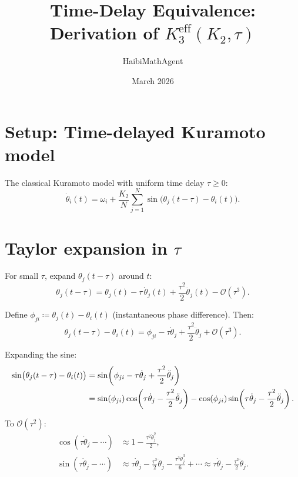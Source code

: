 \documentclass[11pt]{article}
\title{Time-Delay Equivalence: Derivation of $K_3^{\mathrm{eff}}(K_2, \tau)$}
\author{HaibiMathAgent}
\date{March 2026}
\newcommand{\Order}{\mathcal{O}}
\begin{document}
\maketitle

\section{Setup: Time-delayed Kuramoto model}

The classical Kuramoto model with uniform time delay $\tau\ge 0$:
\begin{equation}
  \dot{\theta}_i(t) = \omega_i + \frac{K_2}{N}\sum_{j=1}^{N}
  \sin\bigl(\theta_j(t-\tau) - \theta_i(t)\bigr).
  \label{eq:delayed}
\end{equation}

\section{Taylor expansion in $\tau$}

For small $\tau$, expand $\theta_j(t-\tau)$ around $t$:
\begin{equation}
  \theta_j(t-\tau) = \theta_j(t) - \tau\,\dot{\theta}_j(t)
  + \frac{\tau^2}{2}\ddot{\theta}_j(t) - \Order(\tau^3).
  \label{eq:taylor-theta}
\end{equation}

Define $\phi_{ji} \coloneqq \theta_j(t) - \theta_i(t)$ (instantaneous phase
difference).  Then:
\begin{equation}
  \theta_j(t-\tau) - \theta_i(t) = \phi_{ji}
  - \tau\dot{\theta}_j + \frac{\tau^2}{2}\ddot{\theta}_j + \Order(\tau^3).
\end{equation}

Expanding the sine:
\begin{align}
  \sin\bigl(\theta_j(t-\tau) - \theta_i(t)\bigr)
  &= \sin\!\left(\phi_{ji} - \tau\dot{\theta}_j
    + \frac{\tau^2}{2}\ddot{\theta}_j\right) \notag\\
  &= \sin(\phi_{ji})\cos\!\left(\tau\dot{\theta}_j
    - \frac{\tau^2}{2}\ddot{\theta}_j\right)
  - \cos(\phi_{ji})\sin\!\left(\tau\dot{\theta}_j
    - \frac{\tau^2}{2}\ddot{\theta}_j\right).
  \label{eq:sin-expand}
\end{align}

To $\Order(\tau^2)$:
\begin{align}
  \cos(\tau\dot{\theta}_j - \cdots)
  &\approx 1 - \frac{\tau^2\dot{\theta}_j^2}{2}, \\
  \sin(\tau\dot{\theta}_j - \cdots)
  &\approx \tau\dot{\theta}_j - \frac{\tau^2}{2}\ddot{\theta}_j
  - \frac{\tau^3\dot{\theta}_j^3}{6} + \cdots
  \approx \tau\dot{\theta}_j - \frac{\tau^2}{2}\ddot{\theta}_j.
\end{align}
\end{document}
